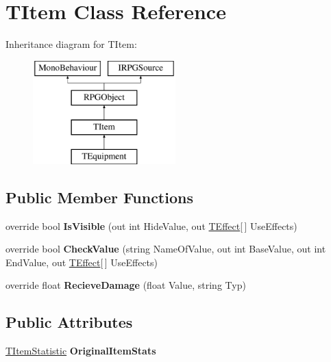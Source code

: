 \hypertarget{class_t_item}{}\section{T\+Item Class Reference}
\label{class_t_item}
Inheritance diagram for T\+Item\+:\begin{figure}[H]
\begin{center}
\leavevmode
\includegraphics[height=4.000000cm]{class_t_item}
\end{center}
\end{figure}
\subsection*{Public Member Functions}
\begin{DoxyCompactItemize}
\item 
\hypertarget{class_t_item_ae76729202f7144486114a93b9e9dd939}{}override bool {\bfseries Is\+Visible} (out int Hide\+Value, out \hyperlink{class_t_effect}{T\+Effect}\mbox{[}$\,$\mbox{]} Use\+Effects)\label{class_t_item_ae76729202f7144486114a93b9e9dd939}

\item 
\hypertarget{class_t_item_a36fbd6661d50dc4a3e5769b25d59c11e}{}override bool {\bfseries Check\+Value} (string Name\+Of\+Value, out int Base\+Value, out int End\+Value, out \hyperlink{class_t_effect}{T\+Effect}\mbox{[}$\,$\mbox{]} Use\+Effects)\label{class_t_item_a36fbd6661d50dc4a3e5769b25d59c11e}

\item 
\hypertarget{class_t_item_a72a080788b4d4c31b76bea44fef6cd08}{}override float {\bfseries Recieve\+Damage} (float Value, string Typ)\label{class_t_item_a72a080788b4d4c31b76bea44fef6cd08}

\end{DoxyCompactItemize}
\subsection*{Public Attributes}
\begin{DoxyCompactItemize}
\item 
\hypertarget{class_t_item_a2f0849825d38e3b77ccad769a95244d0}{}\hyperlink{class_t_item_statistic}{T\+Item\+Statistic} {\bfseries Original\+Item\+Stats}\label{class_t_item_a2f0849825d38e3b77ccad769a95244d0}

\end{DoxyCompactItemize}

